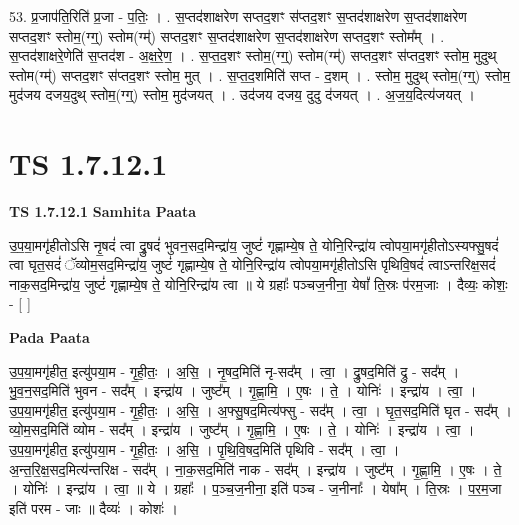 \documentclass[17pt]{extarticle}
\begin{document}
53. प्र॒जाप॑ति॒रिति॑ प्र॒जा - प॒तिः॒ । . स॒प्तद॑शाक्षरेण सप्तद॒शꣳ स॑प्तद॒शꣳ स॒प्तद॑शाक्षरेण स॒प्तद॑शाक्षरेण सप्तद॒शꣳ स्तोम॒(ग्ग्॒) स्तोम(ग्म्॑) सप्तद॒शꣳ स॒प्तद॑शाक्षरेण स॒प्तद॑शाक्षरेण सप्तद॒शꣳ स्तोम᳚म् । . स॒प्तद॑शाक्षरे॒णेति॑ स॒प्तद॑श - अ॒क्ष॒रे॒ण॒ । . स॒प्त॒द॒शꣳ स्तोम॒(ग्ग्॒) स्तोम(ग्म्॑) सप्तद॒शꣳ स॑प्तद॒शꣳ स्तोम॒ मुदुथ् स्तोम(ग्म्॑) सप्तद॒शꣳ स॑प्तद॒शꣳ स्तोम॒ मुत् । . स॒प्त॒द॒शमिति॑ सप्त - द॒शम् । . स्तोम॒ मुदुथ् स्तोम॒(ग्ग्॒) स्तोम॒ मुद॑जय दजय॒दुथ् स्तोम॒(ग्ग्॒) स्तोम॒ मुद॑जयत् । . उद॑जय दजय॒ दुदु द॑जयत् । . अ॒ज॒य॒दित्य॑जयत् । \newline
\pagebreak
{}
\section*{ TS 1.7.12.1 }

\textbf{TS 1.7.12.1 } \newline
\textbf{Samhita Paata} \newline

उ॒प॒या॒मगृ॑हीतोऽसि नृ॒षदं॑ त्वा द्रु॒षदं॑ भुवन॒सद॒मिन्द्रा॑य॒ जुष्टं॑ गृह्णाम्ये॒ष ते॒ योनि॒रिन्द्रा॑य त्वोपया॒मगृ॑हीतोऽस्यफ्सु॒षदं॑ त्वा घृत॒सदं॑ ॅव्योम॒सद॒मिन्द्रा॑य॒ जुष्टं॑ गृह्णाम्ये॒ष ते॒ योनि॒रिन्द्रा॑य त्वोपया॒मगृ॑हीतोऽसि पृथिवि॒षदं॑ त्वाऽन्तरिक्ष॒सदं॑ नाक॒सद॒मिन्द्रा॑य॒ जुष्टं॑ गृह्णाम्ये॒ष ते॒ योनि॒रिन्द्रा॑य त्वा ॥ ये ग्रहाः᳚ पञ्चज॒नीना॒ येषां᳚ ति॒स्रः प॑रम॒जाः । दैव्यः॒ कोशः॒ - [ ] \newline

\textbf{Pada Paata} \newline

उ॒प॒या॒मगृ॑हीत॒ इत्यु॑पया॒म - गृ॒ही॒तः॒ । अ॒सि॒ । नृ॒षद॒मिति॑ नृ-सद᳚म् । त्वा॒ । द्रु॒षद॒मिति॑ द्रु - सद᳚म् । भु॒व॒न॒सद॒मिति॑ भुवन - सद᳚म् । इन्द्रा॑य । जुष्ट᳚म् । गृ॒ह्णा॒मि॒ । ए॒षः । ते॒ । योनिः॑ । इन्द्रा॑य । त्वा॒ । उ॒प॒या॒मगृ॑हीत॒ इत्यु॑पया॒म - गृ॒ही॒तः॒ । अ॒सि॒ । अ॒फ्सु॒षद॒मित्य॑फ्सु - सद᳚म् । त्वा॒ । घृ॒त॒सद॒मिति॑ घृत - सद᳚म् । व्यो॒म॒सद॒मिति॑ व्योम - सद᳚म् । इन्द्रा॑य । जुष्ट᳚म् । गृ॒ह्णा॒मि॒ । ए॒षः । ते॒ । योनिः॑ । इन्द्रा॑य । त्वा॒ । उ॒प॒या॒मगृ॑हीत॒ इत्यु॑पया॒म - गृ॒ही॒तः॒ । अ॒सि॒ । पृ॒थि॒वि॒षद॒मिति॑ पृथिवि - सद᳚म् । त्वा॒ । अ॒न्त॒रि॒क्ष॒सद॒मित्य॑न्तरिक्ष - सद᳚म् । ना॒क॒सद॒मिति॑ नाक - सद᳚म् । इन्द्रा॑य । जुष्ट᳚म् । गृ॒ह्णा॒मि॒ । ए॒षः । ते॒ । योनिः॑ । इन्द्रा॑य । त्वा॒ ॥ ये । ग्रहाः᳚ । प॒ञ्च॒ज॒नीना॒ इति॑ पञ्च - ज॒नीनाः᳚ । येषा᳚म् । ति॒स्रः । प॒र॒म॒जा इति॑ परम - जाः ॥ दैव्यः॑ । कोशः॑ ।  \newline
\end{document}
